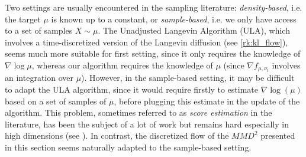 \begin{remark}
	Two settings are usually encountered in the sampling literature: \textit{density-based}, i.e. the target $\mu$ is known up to a constant, or \textit{sample-based}, i.e. we only have access to a set of samples $X \sim \mu$.
	The Unadjusted Langevin Algorithm (ULA), which involves a time-discretized version of the Langevin diffusion (see \cref{rk:kl_flow}), seems much more suitable for first setting, since it only requires the knowledge of $\nabla \log \mu$, whereas our algorithm requires the knowledge of $\mu$ (since $\nabla f_{\mu, \nu_t}$ involves an integration over $\mu$). However, in the sample-based setting, it may be difficult to adapt the ULA algorithm, since it would require firstly to estimate $\nabla \log(\mu)$ based on a set of samples of $\mu$, before plugging this estimate in the update of the algorithm. This problem, sometimes referred to as \textit{score estimation} in the literature, has been the subject of a lot of work but remains hard especially in high dimensions (see \cite{sutherland2017efficient,li2018gradient,shi2018spectral}). In contrast, the discretized flow of the $MMD^2$ presented in this section seems naturally adapted to the sample-based setting.
\end{remark}